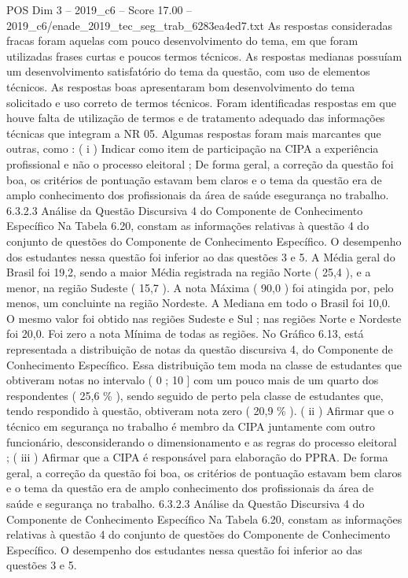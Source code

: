 \begin{textsample}{POS Dim 3 – 2019\_c6 – Score 17.00 – 2019\_c6/enade\_2019\_tec\_seg\_trab\_6283ea4ed7.txt}
As respostas consideradas fracas foram aquelas com pouco desenvolvimento do tema, em que foram utilizadas frases curtas e poucos termos técnicos.
As respostas medianas possuíam um desenvolvimento satisfatório do tema da questão, com uso de elementos técnicos.
As respostas boas apresentaram bom desenvolvimento do tema solicitado e uso correto de termos técnicos.
Foram identificadas respostas em que houve falta de utilização de termos e de tratamento adequado das informações técnicas que integram a NR 05.
Algumas respostas foram mais marcantes que outras, como : ( i ) Indicar como item de participação na CIPA a experiência profissional e não o processo eleitoral ; De forma geral, a correção da questão foi boa, os critérios de pontuação estavam bem claros e o tema da questão era de amplo conhecimento dos profissionais da área de saúde esegurança no trabalho. 6.3.2.3 Análise da Questão Discursiva 4 do Componente de Conhecimento Específico Na Tabela 6.20, constam as informações relativas à questão 4 do conjunto de questões do Componente de Conhecimento Específico.
O desempenho dos estudantes nessa questão foi inferior ao das questões 3 e 5.
A Média geral do Brasil foi 19,2, sendo a maior Média registrada na região Norte ( 25,4 ), e a menor, na região Sudeste ( 15,7 ).
A nota Máxima ( 90,0 ) foi atingida por, pelo menos, um concluinte na região Nordeste.
A Mediana em todo o Brasil foi 10,0.
O mesmo valor foi obtido nas regiões Sudeste e Sul ; nas regiões Norte e Nordeste foi 20,0.
Foi zero a nota Mínima de todas as regiões.
No Gráfico 6.13, está representada a distribuição de notas da questão discursiva 4, do Componente de Conhecimento Específico.
Essa distribuição tem moda na classe de estudantes que obtiveram notas no intervalo ( 0 ; 10 ] com um pouco mais de um quarto dos respondentes ( 25,6 \% ), sendo seguido de perto pela classe de estudantes que, tendo respondido à questão, obtiveram nota zero ( 20,9 \% ). ( ii ) Afirmar que o técnico em segurança no trabalho é membro da CIPA juntamente com outro funcionário, desconsiderando o dimensionamento e as regras do processo eleitoral ; ( iii ) Afirmar que a CIPA é responsável para elaboração do PPRA.
De forma geral, a correção da questão foi boa, os critérios de pontuação estavam bem claros e o tema da questão era de amplo conhecimento dos profissionais da área de saúde e segurança no trabalho. 6.3.2.3 Análise da Questão Discursiva 4 do Componente de Conhecimento Específico Na Tabela 6.20, constam as informações relativas à questão 4 do conjunto de questões do Componente de Conhecimento Específico.
O desempenho dos estudantes nessa questão foi inferior ao das questões 3 e 5.

\end{textsample}
